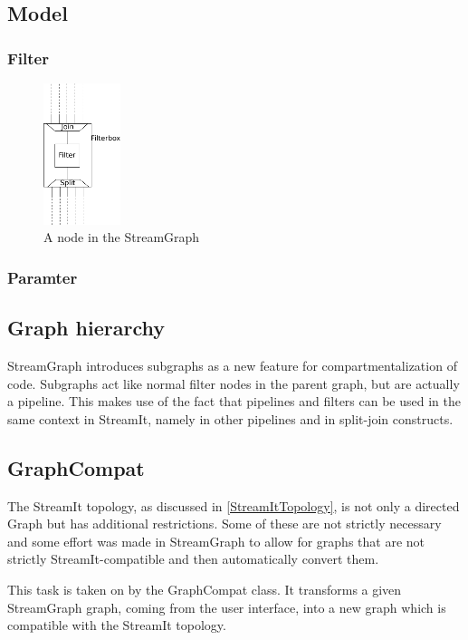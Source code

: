\documentclass[journal]{IEEEtran}
\begin{document}
\subsection{Model}

\subsubsection{Filter}
\begin{figure}[h]
  \centering
  \includegraphics[width=0.2\textwidth]{FilterBoxGraphic}
  \caption{A node in the StreamGraph}
  \label{fig_filter_node}
\end{figure}
\subsubsection{Paramter}


\subsection{Graph hierarchy}

StreamGraph introduces subgraphs as a new feature for compartmentalization of
code. Subgraphs act like normal filter nodes in the parent graph, but are
actually a pipeline. This makes use of the fact that pipelines and filters can
be used in the same context in StreamIt, namely in other pipelines and in
split-join constructs.


\subsection{GraphCompat}

\noindent The StreamIt topology, as discussed in \ref{StreamItTopology}, is not
only a directed Graph but has additional restrictions. Some of these are not
strictly necessary and some effort was made in StreamGraph to allow for graphs
that are not strictly StreamIt-compatible and then automatically convert them.

This task is taken on by the GraphCompat class. It transforms a given
StreamGraph graph, coming from the user interface, into a new graph which
is compatible with the StreamIt topology.
\end{document}
